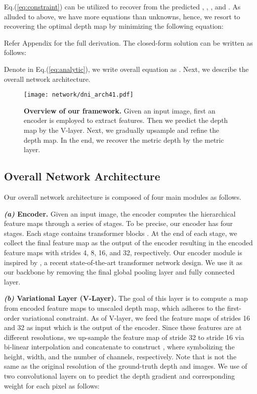 \documentclass{article} \usepackage{iclr2023_conference, times}
\newcommand{\formattedparagraph}[1]{\noindent \textbf{#1}}
\begin{document}
Eq.(\ref{eq:constraint}) can be utilized to recover  from the predicted , , , and . As alluded to above, we have more equations than unknowns, hence, we resort to recovering the optimal depth map  by minimizing the following equation:

Refer Appendix for the full derivation. The closed-form solution can be written as follows:

Denote  in Eq.(\ref{eq:analytic}), we write overall equation as . Next, we describe the overall network architecture.








\begin{figure}[t]
\centering
\texttt{[image: network/dni\_arch41.pdf]}
\caption{\small \textbf{Overview of our framework.} Given an input image, first an encoder is employed to extract features. Then we predict the depth map by the V-layer. Next, we gradually upsample and refine the depth map. In the end, we recover the metric depth by the metric layer.} \label{fig:framwork}
\end{figure}



\subsection{Overall Network Architecture}\label{sec:network}
Our overall network architecture is composed of four main modules as follows.




\formattedparagraph{\textit{(a)} Encoder.} Given an input image, the encoder computes the hierarchical feature maps through a series of stages. To be precise, our encoder has four stages. Each stage contains transformer blocks \citep{liu2021swin}.  At the end of each stage, we collect the final feature map as the output of the encoder resulting in the encoded feature maps with strides 4, 8, 16, and 32, respectively. Our encoder module is inspired by \citet{liu2021swin}, a recent state-of-the-art transformer network design. We use it as our backbone by removing the final global pooling layer and fully connected layer.




\formattedparagraph{\textit{(b)} Variational Layer (V-Layer).} The goal of this layer is to compute a map from encoded feature maps to unscaled depth map, which adheres to the first-order variational constraint. As of V-layer, we feed the feature maps of strides 16 and 32 as input which is the output of the encoder. Since these features are at different resolutions, we up-sample the feature map of stride 32 to stride 16 via bi-linear interpolation and concatenate to construct , where  symbolizing the height, width, and the number of channels, respectively.
Note that  is not the same as the original resolution of the ground-truth depth and images. We use of two convolutional layers on  to predict the depth gradient and corresponding weight for each pixel as follows:
\end{document}
